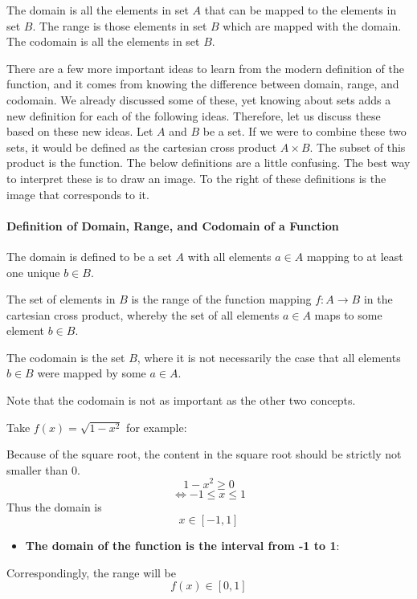The domain is all the elements in set $A$ that can be mapped to the elements in set $B$. The range is those elements in set $B$ which are mapped with the domain. The codomain is all the elements in set $B$.


There are a few more important ideas to learn from the modern definition of the function, and it comes from knowing the difference between domain, range, and codomain. We already discussed some of these, yet knowing about sets adds a new definition for each of the following ideas. Therefore, let us discuss these based on these new ideas. Let $A$ and $B$ be a set. If we were to combine these two sets, it would be defined as the cartesian cross product $A \times B$. The subset of this product is the function. The below definitions are a little confusing. The best way to interpret these is to draw an image. To the right of these definitions is the image that corresponds to it.

\paragraph{Definition of Domain, Range, and Codomain of a Function}

The domain is defined to be a set $A$ with all elements $a \in A$ mapping to at least one unique $b \in B$.

The set of elements in $B$ is the range of the function mapping $f:A \to B$ in the cartesian cross product, whereby the set of all elements $a \in A$ maps to some element $b \in B$.

The codomain is the set $B$, where it is not necessarily the case that all elements $b \in B$ were mapped by some $a \in A$.

Note that the codomain is not as important as the other two concepts.

Take $f(x) = \sqrt{1 - x^2}$ for example:

  Because of the square root, the content in the square root should be strictly not smaller than 0.
  $$
  1 - x^2 \geq 0
  $$
  $$
  \Leftrightarrow -1 \leq x \leq 1
  $$
  Thus the domain is
  $$
  x \in [-1, 1]
  $$
\begin{itemize}
    \item \textbf{The domain of the function is the interval from -1 to 1}:
\end{itemize}

  Correspondingly, the range will be
  $$
  f(x) \in [0, 1]
  $$

